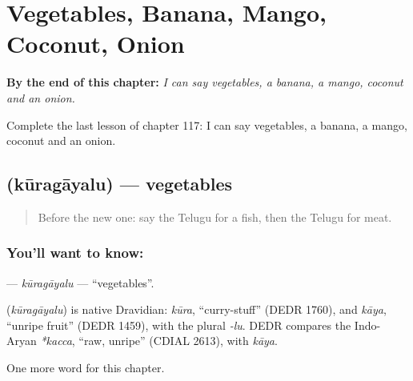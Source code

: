 
\chapter{Vegetables, Banana, Mango, Coconut, Onion}
\label{ch:te-vegetables-banana-mango-coconut-onion}

\begin{chapteropening}
\textbf{By the end of this chapter:} \emph{I can say vegetables, a banana, a mango, coconut and an onion.}

Complete the last lesson of chapter 117: I can say vegetables, a banana, a mango, coconut and an onion.
\end{chapteropening}

\section[\texorpdfstring{\te{కూరగాయలు} (kūragāyalu)}{కూరగాయలు (kūragāyalu)}]{ (kūragāyalu) — vegetables}

\label{lesson:TE-C117-kuragayalu}



\begin{quote}
Before the new one: say the Telugu for a fish, then the Telugu for meat.
\end{quote}

\subsection*{You'll want to know: }
\textbf{} — \emph{kūragāyalu} — \textquotedblleft{}vegetables\textquotedblright{}.

\begin{cousinweb}
\textbf{} (\emph{kūragāyalu}) is native Dravidian: \emph{kūra}, \textquotedblleft{}curry-stuff\textquotedblright{} (DEDR 1760), and \emph{kāya}, \textquotedblleft{}unripe fruit\textquotedblright{} (DEDR 1459), with the plural \emph{-lu}. DEDR compares the Indo-Aryan \emph{*kacca}, \textquotedblleft{}raw, unripe\textquotedblright{} (CDIAL 2613), with \emph{kāya}.
\end{cousinweb}

\begin{grammarlens}[title={What you've built}]
One more word for this chapter.
\end{grammarlens}

